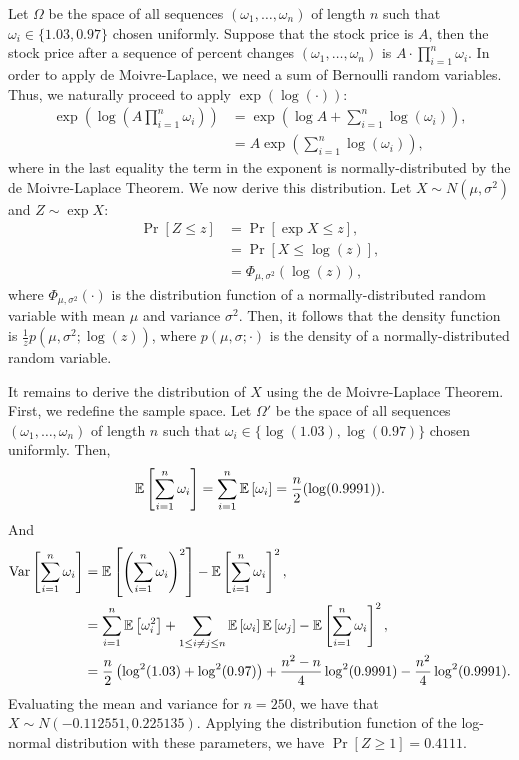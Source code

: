 \begin{problem}{9}
\end{problem}
\begin{solution}
    Let $\Omega$ be the space of all sequences $(\omega_1, \ldots, \omega_n)$ of length $n$ such that $\omega_i \in \{1.03, 0.97\}$ chosen uniformly. Suppose that the stock price is $A$, then the stock price after a sequence of percent changes $(\omega_1,\ldots,\omega_n)$ is $A \cdot \prod_{i=1}^n \omega_i$. In order to apply de Moivre-Laplace, we need a sum of Bernoulli random variables. Thus, we naturally proceed to apply $\exp{(\log(\cdot))}$:
    \begin{align*}
        \exp\left(\log\left(A \prod_{i=1}^n \omega_i\right)\right) &= \exp\left(\log{A} + \sum_{i=1}^n \log(\omega_i)\right), \\
        &= A\exp\left(\sum_{i=1}^n \log(\omega_i)\right),
    \end{align*}
    where in the last equality the term in the exponent is normally-distributed by the de Moivre-Laplace Theorem. We now derive this distribution. Let $X \sim N(\mu,\sigma^2)$ and $Z \sim \exp{X}$:
    \begin{align*}
        \Pr[Z\leq z] &= \Pr[\exp{X} \leq z], \\
        &= \Pr[X\leq \log(z)], \\
        &= \Phi_{\mu, \sigma^2}(\log(z)),
    \end{align*}
    where $\Phi_{\mu,\sigma^2}(\cdot)$ is the distribution function of a normally-distributed random variable with mean $\mu$ and variance $\sigma^2$. Then, it follows that the density function is $\frac{1}{z} p(\mu,\sigma^2;\log(z))$, where $p(\mu,\sigma;\cdot)$ is the density of a normally-distributed random variable.

    It remains to derive the distribution of $X$ using the de Moivre-Laplace Theorem. First, we redefine the sample space. Let $\Omega'$ be the space of all sequences $(\omega_1,\ldots,\omega_n)$ of length $n$ such that $\omega_i \in \{\log(1.03),\log(0.97)\}$ chosen uniformly. Then,
    \[
        \mathbb{E}\left[\sum_{i=1}^n \omega_i\right] = \sum_{i=1}^n \mathbb{E}\left[\omega_i\right] = \frac{n}{2}(\log(0.9991)).
    \]
    And
    \begin{align*}
        \operatorname{Var}\left[{\sum_{i=1}^n \omega_i}\right] &= \mathbb{E}\left[\left(\sum_{i=1}^n \omega_i\right)^2\right] - \mathbb{E}\left[\sum_{i=1}^n \omega_i\right]^2, \\
        &= \sum_{i=1}^n \mathbb{E}\left[\omega_i^2\right] + \sum_{1\leq i\neq j\leq n} \mathbb{E}\left[\omega_i\right]\mathbb{E}\left[\omega_j\right] - \mathbb{E}\left[\sum_{i=1}^n\omega_i\right]^2, \\
        &= \frac{n}{2}\left(\log^2(1.03) + \log^2(0.97)\right) + \frac{n^2 - n}{4}\log^2(0.9991) - \frac{n^2}{4} \log^2(0.9991). 
    \end{align*}
    Evaluating the mean and variance for $n=250$, we have that $X \sim N(-0.112551, 0.225135)$. Applying the distribution function of the log-normal distribution with these parameters, we have $\Pr[Z \geq 1] = 0.4111$.
\end{solution}